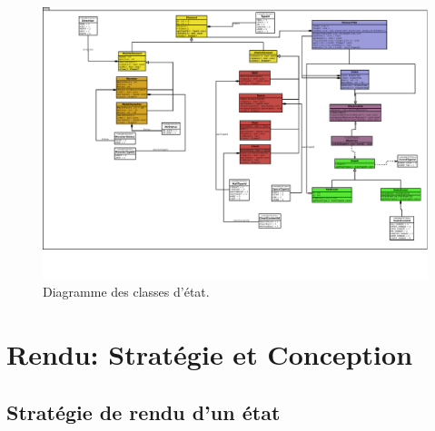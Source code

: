 \documentclass[a4paper,12pt]{article}
\begin{document}
\begin{landscape}
\begin{figure}[p]
\includegraphics[width=0.9\paperheight]{state.pdf}
\caption{\label{uml:state}Diagramme des classes d'état.} 
\end{figure}
\end{landscape}

\clearpage

\section{Rendu: Stratégie et Conception}

\subsection{Stratégie de rendu d'un état}
\end{document}
